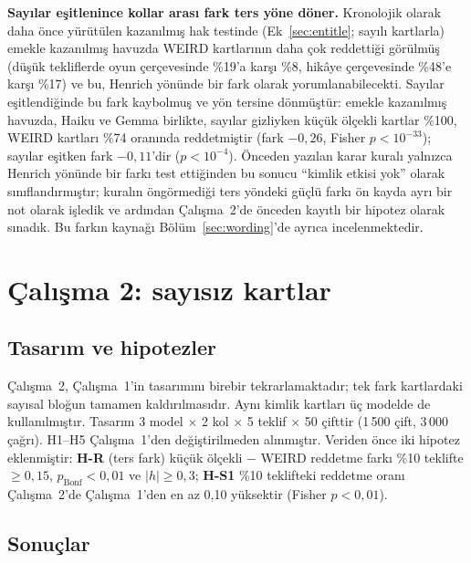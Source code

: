 \documentclass[11pt]{article}
\begin{document}
\textbf{Sayılar eşitlenince kollar arası fark ters yöne döner.} Kronolojik olarak daha önce yürütülen kazanılmış hak testinde (Ek~\ref{sec:entitle}; sayılı kartlarla) emekle kazanılmış havuzda WEIRD kartlarının daha çok reddettiği görülmüş (düşük tekliflerde oyun çerçevesinde \%19'a karşı \%8, hikâye çerçevesinde \%48'e karşı \%17) ve bu, Henrich yönünde bir fark olarak yorumlanabilecekti. Sayılar eşitlendiğinde bu fark kaybolmuş ve yön tersine dönmüştür: emekle kazanılmış havuzda, Haiku ve Gemma birlikte, sayılar gizliyken küçük ölçekli kartlar \%100, WEIRD kartları \%74 oranında reddetmiştir (fark $-0{,}26$, Fisher $p < 10^{-33}$); sayılar eşitken fark $-0{,}11$'dir ($p < 10^{-4}$). Önceden yazılan karar kuralı yalnızca Henrich yönünde bir farkı test ettiğinden bu sonucu ``kimlik etkisi yok'' olarak sınıflandırmıştır; kuralın öngörmediği ters yöndeki güçlü farkı ön kayda ayrı bir not olarak işledik ve ardından Çalışma~2'de önceden kayıtlı bir hipotez olarak sınadık. Bu farkın kaynağı Bölüm~\ref{sec:wording}'de ayrıca incelenmektedir.


\section{Çalışma 2: sayısız kartlar}\label{sec:study2}

\subsection{Tasarım ve hipotezler}

Çalışma~2, Çalışma~1'in tasarımını birebir tekrarlamaktadır; tek fark kartlardaki sayısal bloğun tamamen kaldırılmasıdır. Aynı kimlik kartları üç modelde de kullanılmıştır. Tasarım 3 model $\times$ 2 kol $\times$ 5 teklif $\times$ 50 çifttir (1\,500 çift, 3\,000 çağrı). H1--H5 Çalışma~1'den değiştirilmeden alınmıştır. Veriden önce iki hipotez eklenmiştir: \textbf{H-R} (ters fark) küçük ölçekli $-$ WEIRD reddetme farkı \%10 teklifte $\geq 0{,}15$, $p_{\text{Bonf}} < 0{,}01$ ve $|h| \geq 0{,}3$; \textbf{H-S1} \%10 teklifteki reddetme oranı Çalışma~2'de Çalışma~1'den en az 0,10 yüksektir (Fisher $p < 0{,}01$).

\subsection{Sonuçlar}
\end{document}
